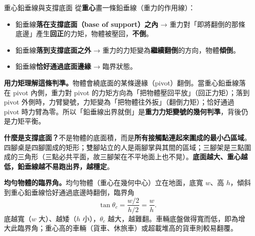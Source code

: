 \documentclass[11pt]{article}
\begin{document}
\begin{補充框}{重心鉛垂線與支撐底面}
從\textbf{重心}畫一條鉛垂線（重力的作用線）：
\begin{itemize}\setlength{\itemsep}{1pt}
\item 鉛垂線\textbf{落在支撐底面（base of support）之內} → 重力對「即將翻倒的那條底邊」產生\textbf{回正}的力矩，物體被壓回，\textbf{不倒}。
\item 鉛垂線\textbf{落到支撐底面之外} → 重力的力矩變為\textbf{繼續翻倒}的方向，物體\textbf{傾倒}。
\item 鉛垂線\textbf{恰好通過底面邊緣} → 臨界狀態。
\end{itemize}

\textbf{用力矩理解這條判準。}物體會繞底面的某條邊緣（pivot）翻倒。當重心鉛垂線落在 pivot 內側，重力對 pivot 的力矩方向為「把物體壓回平放」（回正力矩）；落到 pivot 外側時，力臂變號，力矩變為「把物體往外扳」（翻倒力矩）；恰好通過 pivot 時力臂為零。所以「鉛垂線出界就倒」是\textbf{重力力矩變號的幾何判準}，背後仍是力矩平衡。

\textbf{什麼是支撐底面？}不是物體的底面積，而是\textbf{所有接觸點連起來圍成的最小凸區域}。四腳桌是四腳圍成的矩形；雙腳站立的人是兩腳掌與其間的區域；三腳架是三點圍成的三角形（三點必共平面，故三腳架在不平地面上也不晃）。\textbf{底面越大、重心越低，鉛垂線越不易跑出界，越穩定}。

\textbf{均勻物體的臨界角。}均勻物體（重心在幾何中心）立在地面，底寬 $w$、高 $h$，傾斜到重心鉛垂線恰好通過底邊時翻倒，臨界角
$$\tan\theta_c = \frac{w/2}{h/2} = \frac{w}{h}.$$
底越寬（$w$ 大）、越矮（$h$ 小），$\theta_c$ 越大，越難翻。車輛底盤做得寬而低，即為增大此臨界角；重心高的車輛（貨車、休旅車）或超載堆高的貨車則較易翻覆。
\end{補充框}

\end{document}
